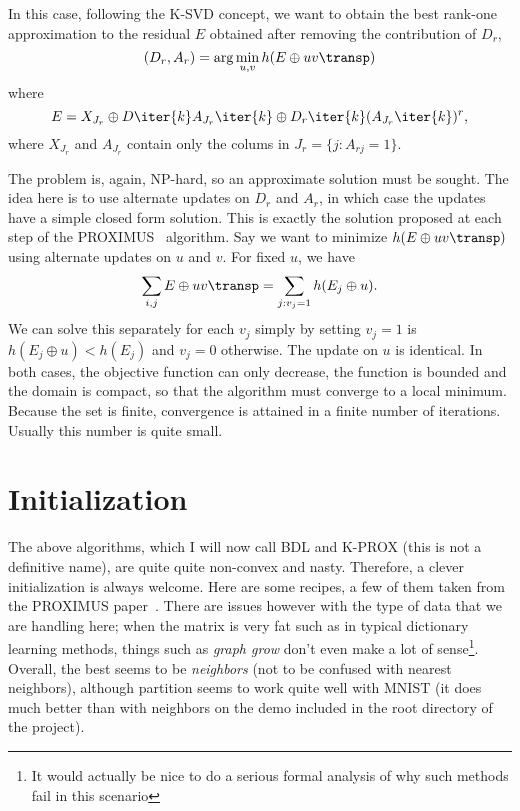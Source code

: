 \documentclass[a4paper]{IEEEtran}
\begin{document}
In this case, following the K-SVD concept, we want to obtain the best rank-one approximation to the residual $E$ obtained after removing the contribution of $D_r$, 
\begin{equation}
(D_r,A_r) = \arg\min_{u,v} h(E \oplus uv\transp)
\label{eq:bsvd1}
\end{equation}
where
\begin{equation}
E =  X_{J_r} \oplus D\iter{k}A_{J_r}\iter{k} \oplus D_r\iter{k}(A_{J_r}\iter{k})^r,
\label{eq:bsvd2}
\end{equation}
where $X_{J_r}$ and $A_{J_r}$ contain only the colums in $J_r = \{j: A_{rj} = 1 \}$.

The problem   is, again, NP-hard, so an approximate solution must be sought. The idea here is to use alternate updates on $D_r$ and $A_r$, in which case the updates have a simple closed form solution. This is exactly the solution proposed at each step of the PROXIMUS~\cite{proximus} algorithm. Say we want to minimize $h(E \oplus uv\transp)$ using alternate updates on $u$ and $v$. For fixed $u$, we have
$$
\sum_{i,j} E \oplus uv\transp = \sum_{j: v_j = 1} h(E_j \oplus u).
$$
We can solve this separately for each $v_j$ simply by setting $v_j = 1$ is $h(E_j \oplus u) < h(E_j)$ and $v_j=0$ otherwise. The update on $u$ is identical. In both cases, the objective function can only decrease, the function is bounded and the domain is compact, so that the algorithm must converge to a local minimum. Because the set is finite, convergence is attained in a finite number of iterations. Usually this number is quite small.


\section{Initialization}

The above algorithms, which I will now call BDL and K-PROX (this is not a definitive name), are
quite quite non-convex and nasty. Therefore, a clever initialization is always welcome. Here are
some recipes, a few of them taken from the PROXIMUS paper~\cite{proximus}. There are issues however
with the type of data that we are handling here; when the matrix is very fat such as in typical
dictionary learning methods, things such as \emph{graph grow} don't even make a lot of
sense\footnote{It would actually be nice to do a serious formal analysis of why such methods fail in
  this scenario}. Overall, the best seems to be \emph{neighbors} (not to be confused with nearest neighbors), although partition seems to
work quite well with MNIST (it does much better than with neighbors on the demo included in the root
directory of the project).
\end{document}
